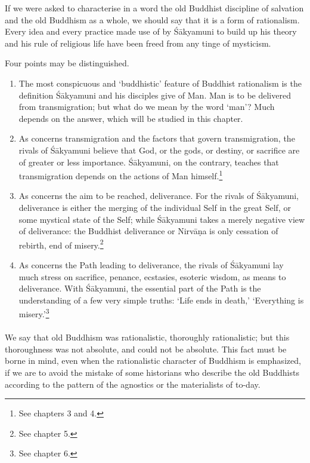 \documentclass[a4paper, 11pt, oneside, english, landscape]{article}
\begin{document}
If we were asked to characterise in a word the old Buddhist discipline of salvation and the old Buddhism as a whole, we should say that it is a form of rationalism. Every idea and every practice made use of by Śākyamuni to build up his theory and his rule of religious life have been freed from any tinge of mysticism.

Four points may be distinguished.
\begin{enumerate}
    \item The most conspicuous and `buddhistic' feature of Buddhist rationalism is the definition Śākyamuni and his disciples give of Man. Man is to be delivered from transmigration; but what do we mean by the word `man'? Much depends on the answer, which will be studied in this chapter.

    \item As concerns transmigration and the factors that govern transmigration, the rivals of Śākyamuni believe that God, or the gods, or destiny, or sacrifice are of greater or less importance. Śākyamuni, on the contrary, teaches that transmigration depends on the actions of Man himself.\footnote{See chapters 3 and 4.}
    
    \item As concerns the aim to be reached, deliverance. For the rivals of Śākyamuni, deliverance is either the merging of the individual Self in the great Self, or some mystical state of the Self; while Śākyamuni takes a merely negative view of deliverance: the Buddhist deliverance or Nirvāṇa is only cessation of rebirth, end of misery.\footnote{See chapter 5.}
    
    \item As concerns the Path leading to deliverance, the rivals of Śākyamuni lay much stress on sacrifice, penance, ecstasies, esoteric wisdom, as means to deliverance. With Śākyamuni, the essential part of the Path is the understanding of a few very simple truths: `Life ends in death,' `Everything is misery.'\footnote{See chapter 6.}
\end{enumerate}
\paragraph{}
We say that old Buddhism was rationalistic, thoroughly rationalistic; but this thoroughness was not absolute, and could not be absolute. This fact must be borne in mind, even when the rationalistic character of Buddhism is emphasized, if we are to avoid the mistake of some historians who describe the old Buddhists according to the pattern of the agnostics or the materialists of to-day.
\end{document}
